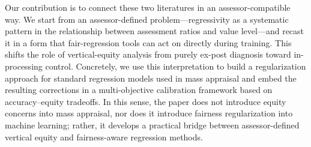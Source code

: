 \documentclass[12pt, draft]{article}
\theoremstyle{plain}
\theoremstyle{definition}
\newcommand{\1}{\mathbf{1}}
\begin{document}
Our contribution is to connect these two literatures in an assessor-compatible way. We start from an assessor-defined problem---regressivity as a systematic pattern in the relationship between assessment ratios and value level---and recast it in a form that fair-regression tools can act on directly during training. This shifts the role of vertical-equity analysis from purely ex-post diagnosis toward in-processing control. Concretely, we use this interpretation to build a regularization approach for standard regression models used in mass appraisal and embed the resulting corrections in a multi-objective calibration framework based on accuracy--equity tradeoffs. In this sense, the paper does not introduce equity concerns into mass appraisal, nor does it introduce fairness regularization into machine learning; rather, it develops a practical bridge between assessor-defined vertical equity and fairness-aware regression methods.
\end{document}

